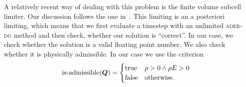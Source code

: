 A relatively recent way of dealing with this problem is the finite volume subcell limiter.
Our discussion follows the one in~\cite{dumbser2016simple}.
This limiting is an a posteriori limiting, which means that we first evaluate a timestep with an unlimited \textsc{ader-dg} method and then check, whether our solution is \enquote{correct}.
In our case, we check whether the solution is a valid floating point number.
We also check whether it is physically admissible.
In our case we use the criterion
\begin{equation}
  \label{eq:limiting-physical}
  \operatorname{is-admissible}(\bm{Q}) =
  \begin{cases}
    \text{true} & \rho > 0 \land \rho E > 0 \\
    \text{false} & \text{otherwise}.
  \end{cases}
\end{equation}

